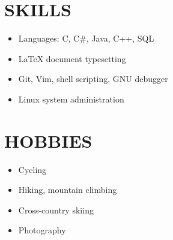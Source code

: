 \documentclass{res}
\begin{document}
\begin{resume}
\section{SKILLS}          
\begin{itemize}
	\item Languages: C, C\#, Java, C++, SQL
	\item \LaTeX{} document typesetting
	\item Git, Vim, shell scripting, GNU debugger
	\item Linux system administration
\end{itemize}

\section{HOBBIES}
\begin{itemize}
	\item Cycling 	
	\item Hiking, mountain climbing
	\item Cross-country skiing 	
	\item Photography
\end{itemize}

\end{resume}
\end{document}
